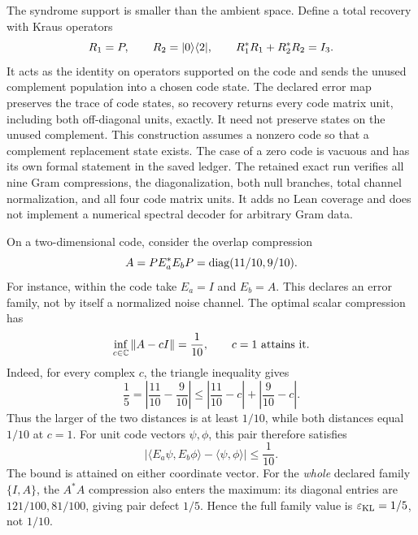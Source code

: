 The syndrome support is smaller than the ambient space. Define a total recovery with Kraus operators
\[
R_1=P,\qquad R_2=\lvert 0\rangle\langle 2\rvert,
\qquad R_1^*R_1+R_2^*R_2=I_3.
\]
It acts as the identity on operators supported on the code and sends the unused complement population into a chosen code state. The declared error map preserves the trace of code states, so recovery returns every code matrix unit, including both off-diagonal units, exactly. It need not preserve states on the unused complement.
This construction assumes a nonzero code so that a complement replacement state exists. The case of a zero code is vacuous and has its own formal statement in the saved ledger. The retained exact run verifies all nine Gram compressions, the diagonalization, both null branches, total channel normalization, and all four code matrix units. It adds no Lean coverage and does not implement a numerical spectral decoder for arbitrary Gram data.

On a two-dimensional code, consider the overlap compression
\[
A=PE_a^*E_bP=\operatorname{diag}(11/10,9/10).
\]
For instance, within the code take $E_a=I$ and $E_b=A$. This declares an error family, not by itself a normalized noise channel. The optimal scalar compression has
\[
\inf_{c\in\CC}\norm{A-cI}=\frac1{10},\qquad c=1\ \text{attains it}.
\]
Indeed, for every complex $c$, the triangle inequality gives
\[
\frac15=\left|\frac{11}{10}-\frac9{10}\right|
\leq\left|\frac{11}{10}-c\right|+\left|\frac9{10}-c\right|.
\]
Thus the larger of the two distances is at least $1/10$, while both distances equal $1/10$ at $c=1$.
For unit code vectors $\psi,\phi$, this pair therefore satisfies
\[
\left|\langle E_a\psi,E_b\phi\rangle-\langle\psi,\phi\rangle\right|
\leq\frac1{10}.
\]
The bound is attained on either coordinate vector. For the \emph{whole} declared family $\{I,A\}$, the $A^*A$ compression also enters the maximum: its diagonal entries are $121/100,81/100$, giving pair defect $1/5$. Hence the full family value is $\varepsilon_{\rm KL}=1/5$, not $1/10$.

